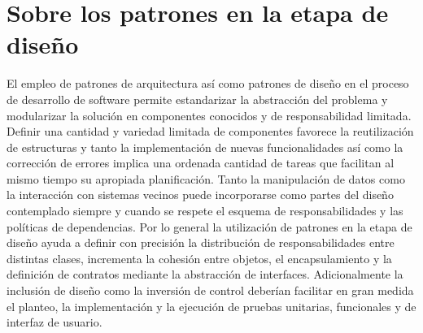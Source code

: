 \section{Sobre los patrones en la etapa de diseño}
El empleo de patrones de arquitectura así como patrones de diseño en el proceso de desarrollo de software permite estandarizar la abstracción del problema y modularizar la solución en componentes conocidos y de responsabilidad limitada. Definir una cantidad y variedad limitada de componentes favorece la reutilización de estructuras y tanto la implementación de nuevas funcionalidades así como la corrección de errores implica una ordenada cantidad de tareas que facilitan al mismo tiempo su apropiada planificación.
Tanto la manipulación de datos como la interacción con sistemas vecinos puede incorporarse como partes del diseño contemplado siempre y cuando se respete el esquema de responsabilidades y las políticas de dependencias.
Por lo general la utilización de patrones en la etapa de diseño ayuda a definir con precisión la distribución de responsabilidades entre distintas clases, incrementa la cohesión entre objetos, el encapsulamiento y la definición de contratos mediante la abstracción de interfaces.
Adicionalmente la inclusión de diseño como la inversión de control deberían facilitar en gran medida el planteo, la implementación y la ejecución de pruebas unitarias, funcionales y de interfaz de usuario.






